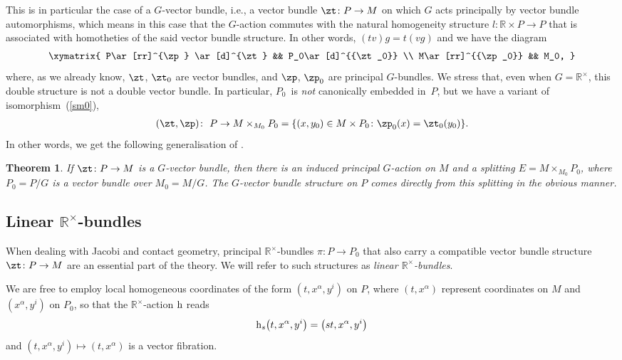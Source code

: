 \documentclass[pdftex]{sigma}
\newcommand{\rmh}{\textnormal{h}}
\newcommand{\R}{{\mathbb R}}
\newcommand{\ti}{\times}
\numberwithin{equation}{section}
\newtheorem{Theorem}{Theorem}[section]
\begin{document}
This is in particular the case of a $G$-vector bundle, i.e., a vector bundle $\zt\colon P\to M$ on which $G$ acts principally by vector bundle automorphisms, which means in this case that the $G$-action commutes with the natural homogeneity structure ${l} \colon \mathbb{R} \times P \rightarrow P$ that is associated with homotheties of the said vector bundle structure. In other words, $(tv)g=t(vg)$ and we have the diagram
\begin{gather*}%
\xymatrix{
P\ar[rr]^{\zp} \ar[d]^{\zt} && P_0\ar[d]^{{\zt_0}} \\
M\ar[rr]^{{\zp_0}} && M_0, }
\end{gather*}
where, as we already know, $\zt$, $\zt_0$ are vector bundles, and $\zp$, $\zp_0$ are principal $G$-bundles. We stress that, even when $G =\R^\ti$, this double structure is not a double vector bundle. In particular, $P_{0}$~is \emph{not} canonically embedded in~$P$, but we have a variant of isomorphism~(\ref{sm0}),
\begin{gather}\label{ident}
(\zt,\zp)\colon \ P\to M\ti_{M_0}P_0=\{(x,y_0)\in M\ti P_0\colon \zp_0(x)=\zt_0(y_0)\}.
\end{gather}
In other words, we get the following generalisation of \cite[Theorem~3.2]{Grabowski2013}.
\begin{Theorem} If $\zt\colon P\to M$ is a $G$-vector bundle, then there is an induced principal $G$-action on $M$ and a splitting $E=M\ti_{M_0}P_0$, where $P_0=P/G$ is a vector bundle over $M_0=M/G$. The $G$-vector bundle structure on $P$ comes directly from this splitting in the obvious manner.
\end{Theorem}

\subsection[Linear $\R^\ti$-bundles]{Linear $\boldsymbol{\R^\ti}$-bundles}
When dealing with Jacobi and contact geometry, principal $\mathbb{R}^{\times}$-bundles $\pi \colon P\rightarrow P_{0} $ that also carry a compatible vector bundle structure $\zt\colon P\to M$ are an essential part of the theory. We will refer to such structures as \emph{linear $\R^\ti$-bundles}.

We are free to employ local homogeneous coordinates of the form $(t, x^{\alpha}, y^{i})$ on $P$, where $(t, x^{\alpha})$ represent coordinates on $M$ and $(x^{\alpha}, y^{i})$ on $P_{0}$, so that the $\R^\ti$-action $\rmh$ reads
\begin{gather*}%
\rmh_s\big(t, x^{\alpha}, y^{i}\big)=\big(s t, x^{\alpha}, y^{i}\big)
\end{gather*}
 and $(t, x^{\alpha}, y^{i})\mapsto (t, x^{\alpha})$ is a vector f\/ibration.
\end{document}
